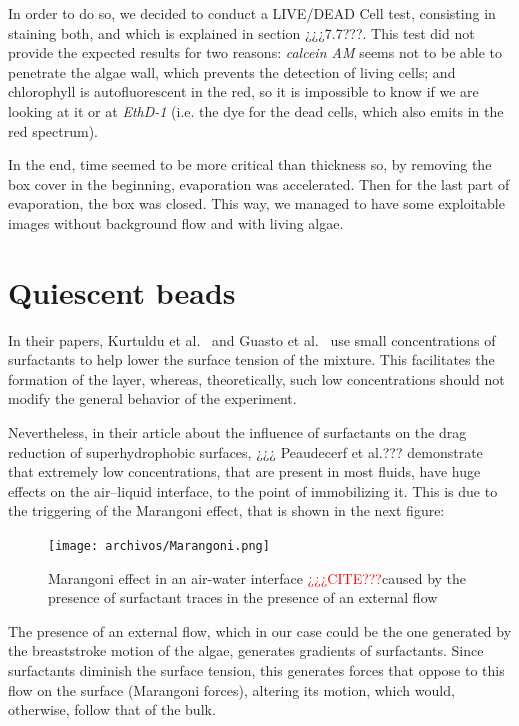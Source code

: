 In order to do so, we decided to conduct a LIVE/DEAD Cell test, consisting in staining both, and which is explained in section ¿¿¿7.7???. This test did not provide the expected results for two reasons: \textit{calcein AM} seems not to be able to penetrate the algae wall, which prevents the detection of living cells; and chlorophyll is autofluorescent in the red, so it is impossible to know if we are looking at it or at \textit{EthD-1} (i.e. the dye for the dead cells, which also emits in the red spectrum).

In the end, time seemed to be more critical than thickness so, by removing the box cover in the beginning, evaporation was accelerated. Then for the last part of evaporation, the box was closed. This way, we managed to have some exploitable images without background flow and with living algae.

\section{Quiescent beads}
 
In their papers, Kurtuldu et al.~\cite{Kurtuldu2011} and Guasto et al.~\cite{Guasto} use small concentrations of surfactants to help lower the surface tension of the mixture. This facilitates the formation of the layer, whereas, theoretically, such low concentrations should not modify the general behavior of the experiment.

Nevertheless, in their article about the influence of surfactants on the drag
reduction of superhydrophobic surfaces, ¿¿¿ Peaudecerf et al.??? demonstrate that extremely low concentrations, that are present in most fluids, have huge effects on the air–liquid interface, to the point of immobilizing it. This is due to the triggering of the Marangoni effect, that is shown in the next figure:

\begin{figure}[H]
	\centering
	\texttt{[image: archivos/Marangoni.png]}
	\caption[Caption]{Marangoni effect in an air-water interface \textcolor{red}{¿¿¿CITE???}\protect\footnotemark caused by the presence of surfactant traces in the presence of an external flow}
	\label{Marangoni}
\end{figure}


The presence of an external flow, which in our case could be the one generated by the breaststroke motion of the algae, generates gradients of surfactants. Since surfactants diminish the surface tension, this generates forces that oppose to this flow on the surface (Marangoni forces), altering its motion, which would, otherwise, follow that of the bulk.

